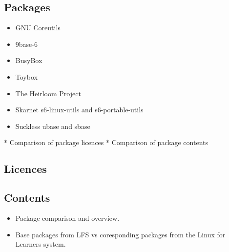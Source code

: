 \subsection{Packages}\label{Packages}

\begin{itemize}
    \item GNU Coreutils \cite{coreutils}
    \item 9base-6 \cite{9base}
    \item BusyBox \cite{busybox}
    \item Toybox \cite{toybox}
    \item The Heirloom Project \cite{heirloom}
    \item Skarnet s6-linux-utils \cite{s6-linux} and s6-portable-utils \cite{s6-portable}
    \item Suckless ubase \cite{ubase} and sbase \cite{sbase}
\end{itemize}

* Comparison of package licences
* Comparison of package contents

\subsection{Licences}

\subsection{Contents}

\begin{itemize}
    \item Package comparison and overview.
    \item Base packages from LFS vs coresponding packages from the Linux for Learners system.
\end{itemize}

